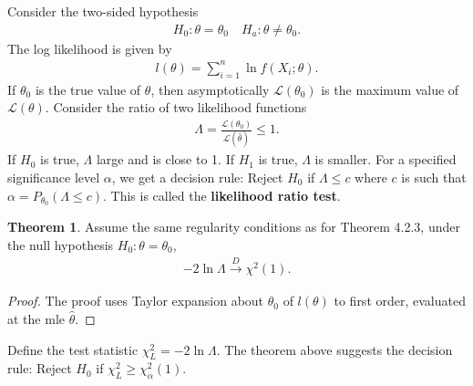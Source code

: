 \documentclass{book}
\theoremstyle{definition}
\newtheorem{thm}{Theorem}[section]
\newcommand{\lag}{\mathcal{L}}
\newcommand{\al}{\alpha}
\newcommand{\f}[2]{\frac{#1}{#2}}
\begin{document}
Consider the two-sided hypothesis
\begin{align}
H_0 : \theta = \theta_0 \quad H_a : \theta \neq \theta_0.
\end{align}
The log likelihood is given by
\begin{align}
l(\theta)  = \sum^n_{i=1} \ln f(X_i;\theta).
\end{align}
If $\theta_0$ is the true value of $\theta$, then asymptotically $\lag(\theta_0)$ is the maximum value of $\lag(\theta)$. Consider the ratio of two likelihood functions
\begin{align}
\Lambda = \f{\lag(\theta_0)}{\lag (\hat\theta)} \leq 1. 
\end{align}
If $H_0$ is true, $\Lambda$ large and is close to 1. If $H_1$ is true, $\Lambda$ is smaller. For a specified significance level $\al$, we get a decision rule: Reject $H_0$ if $\Lambda \leq c$ where $c$ is such that $\al = P_{\theta_0}(\Lambda \leq c)$. This is called the \textbf{likelihood ratio test}.





\begin{thm}
	Assume the same regularity conditions as for Theorem 4.2.3, under the null hypothesis $H_0 : \theta = \theta_0$,
	\begin{align}
	-2\ln \Lambda \xrightarrow{D} \chi^2(1).
	\end{align}	
\end{thm}


\begin{proof}
	The proof uses Taylor expansion about $\theta_0$ of $l(\theta)$ to first order, evaluated at the mle $\hat\theta$.  
\end{proof}


Define the test statistic $\chi^2_L = -2\ln \Lambda$. The theorem above suggests the decision rule: Reject $H_0$ if $\chi^2_L \geq \chi^2_\al(1)$.\\
\end{document}
